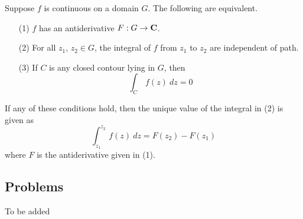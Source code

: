 \vspace*{1em}

\begin{theorem}
Suppose $f$ is continuous on a domain $G$. The following are equivalent. 
\begin{itemize}
\item[(1)] $f$ has an antiderivative $F: G \to \mathbf C$. 
\item[(2)] For all $z_1,\,z_2 \in G$, the integral of $f$ from $z_1$ to $z_2$ are independent of path.
\item[(3)] If $C$ is any closed contour lying in $G$, then
\[\int_C\,f(z)\ dz = 0\]
\end{itemize}
If any of these conditions hold, then the unique value of the integral in (2) is given as
\[\int_{z_1}^{z_2}\,f(z)\ dz = F(z_2) - F(z_1)\]
where $F$ is the antiderivative given in (1).
\end{theorem}

\vspace*{2em}

\subsection{Problems}
\vspace{0.1in}
To be added
%
